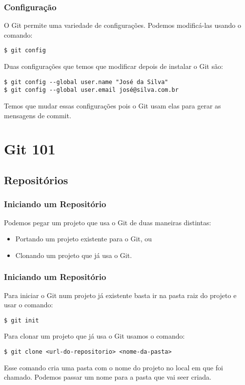 \documentclass[brazil]{beamer}
\begin{document}
\begin{frame}[fragile]
  \frametitle{Configuração}
  O Git permite uma variedade de configurações. Podemos modificá-las usando o comando:
  \begin{block}{}
    \verb#$ git config#
  \end{block}
  \pause
  Duas configurações que temos que modificar depois de instalar o Git são:
  \begin{block}{}
      \verb#$ git config --global user.name "José da Silva"# \\
      \verb#$ git config --global user.email josé@silva.com.br#
  \end{block}
  Temos que mudar essas configurações pois o Git usam elas para gerar as mensagens de commit.
\end{frame}

\section{Git 101}

\subsection{Repositórios}

\begin{frame}[fragile]
  \frametitle{Iniciando um Repositório}
  Podemos pegar um projeto que usa o Git de duas maneiras distintas:
  \begin{itemize}
    \item Portando um projeto existente para o Git, ou
    \item Clonando um projeto que já usa o Git.
  \end{itemize}
\end{frame}

\begin{frame}[fragile]
  \frametitle{Iniciando um Repositório}
  Para iniciar o Git num projeto já existente basta ir na pasta raiz do projeto e usar o comando:
  \begin{block}{}
    \verb#$ git init#
  \end{block}
  \pause
  Para clonar um projeto que já usa o Git usamos o comando:
  \begin{block}{}
    \verb#$ git clone <url-do-repositorio> <nome-da-pasta>#
  \end{block}
  Esse comando cria uma pasta com o nome do projeto no local em que foi chamado. Podemos
  passar um nome para a pasta que vai seer criada.
\end{frame}
\end{document}
